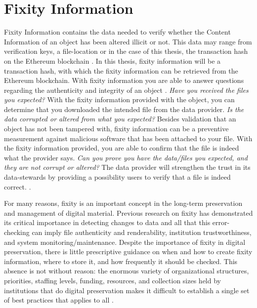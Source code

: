 \section{Fixity Information}
Fixity Information contains the data needed to verify whether the Content Information of an object has been altered illicit or not. This data may range from verification keys, a file-location or in the case of this thesis, the transaction hash on the Ethereum blockchain \cite[8]{lee2010open}. In this thesis, fixity information will be a transaction hash, with which the fixity information can be retrieved from the Ethereum blockchain.
With fixity information you are able to answer questions regarding the authenticity and integrity of an object \cite[3]{ndsa2017fixity}.
\newline \textit{Have you received the files you expected?} With the fixity information provided with the object, you can determine that you downloaded the intended file from the data provider.
\newline \textit{Is the data corrupted or altered from what you expected?}  Besides validation that an object has not been tampered with, fixity information can be a preventive measurement against malicious software that has been attached to your file. With the fixity information provided, you are able to confirm that the file is indeed what the provider says.
\newline \textit{Can you prove you have the data/files you expected, and they are not corrupt or altered?} The data provider will strengthen the trust in its data-stewards by providing a possibility users to verify that a file is indeed correct.  \cite[2]{ndsa2014fixity}. 

For many reasons, fixity is an important concept in the long-term preservation and management of digital material. Previous research on fixity has demonstrated its critical importance in detecting changes to data and all that this error-checking can imply file authenticity and renderability, institution trustworthiness, and system monitoring/maintenance. Despite the importance of fixity in digital preservation, there is little prescriptive guidance on when and how to create fixity information, where to store it, and how frequently it should be checked. This absence is not without reason: the enormous variety of organizational structures, priorities, staffing levels, funding, resources, and collection sizes held by institutions that do digital preservation makes it difficult to establish a single set of best practices that applies to all \cite[38]{ndsa2017fixity}.
